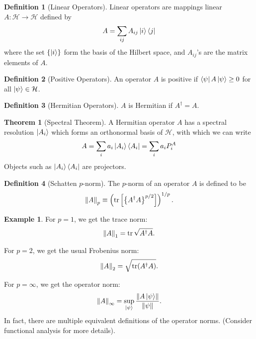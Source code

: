 \documentclass{book}
\theoremstyle{definition}
\newtheorem{defn}{Definition}[section]
\newtheorem{thm}{Theorem}[section]
\newtheorem{exmp}{Example}[section]
\newcommand{\had}{\mathcal{H}}
\newcommand{\f}[2]{\frac{#1}{#2}}
\newcommand{\lp}{\left(}
\newcommand{\rp}{\right)}
\newcommand{\lb}{\left[}
\newcommand{\rb}{\right]}
\newcommand{\lc}{\left\{}
\newcommand{\rc}{\right\}}
\begin{document}
\begin{defn}[Linear Operators]
	Linear operators are mappings linear $A : \had \to \had$ defined by
	\begin{align}
	A = \sum_{ij}A_{ij}\ket{i}\bra{j}
	\end{align}
	where the set $\{ \ket{i} \}$ form the basis of the Hilbert space, and $A_{ij}$'s are the matrix elements of $A$. 
\end{defn}


\begin{defn}[Positive Operators]
	An operator $A$ is positive if  $\bra{\psi}A \ket{\psi} \geq 0$ for all $\ket{\psi} \in \had$.
\end{defn}


\begin{defn}[Hermitian Operators]
	$A$ is Hermitian if $A^\dagger = A$.
\end{defn}

\begin{thm}[Spectral Theorem]
	A Hermitian operator $A$ has a spectral resolution $\ket{A_i}$ which forms an orthonormal basis of $\had$, with which we can write
	\begin{align}
	A = \sum_i a_i \ket{A_i} \bra{A_i} = \sum_i a_i P_i^A
	\end{align}
	Objects such as $\ket{A_i}\bra{A_i}$ are projectors.
\end{thm}




\begin{defn}[Schatten $p$-norm]
	The $p$-norm of an operator $A$ is defined to be
	\begin{align}
	\norm{A}_p \equiv \lp \tr\lb \lc A^\dagger A \rc^{p/2} \rb \rp^{1/p}.
	\end{align}
\end{defn}


\begin{exmp}
	For $p=1$, we get the trace norm: 
	\begin{align}
	\norm{A}_1 = \tr\sqrt{A^\dagger A}.
	\end{align}
	
	For $p=2$, we get the usual Frobenius norm:
	\begin{align}
	\norm{A}_2 = \sqrt{\tr(A^\dagger A)}.
	\end{align}
	
	For $p = \infty$, we get the operator norm:
	\begin{align}
	\norm{A}_\infty = \sup_{\ket{\psi}}\f{\norm{A \ket{\psi}}}{\norm{\psi}}.
	\end{align}	
	In fact, there are multiple equivalent definitions of the operator norms. (Consider functional analysis for more details).
\end{exmp}
\end{document}
